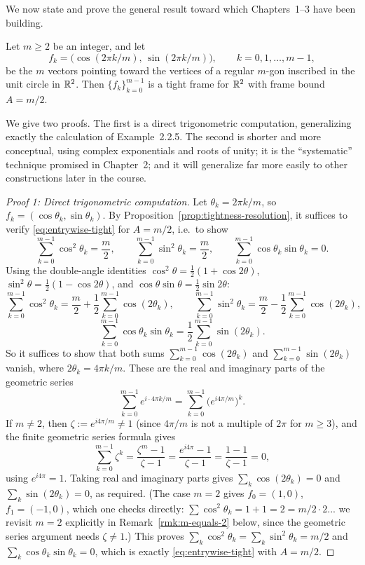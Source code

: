 We now state and prove the general result toward which Chapters~1--3
have been building.

\begin{theorem}
\label{thm:regular-polygon-tight}
Let $m \ge 2$ be an integer, and let
\[
  f_k = \bigl(\cos(2\pi k/m),\, \sin(2\pi k/m)\bigr), \qquad k = 0, 1, \ldots, m-1,
\]
be the $m$ vectors pointing toward the vertices of a regular $m$-gon
inscribed in the unit circle in $\mathbb{R}^2$. Then $\{f_k\}_{k=0}^{m-1}$ is a
tight frame for $\mathbb{R}^2$ with frame bound $A = m/2$.
\end{theorem}

We give two proofs. The first is a direct trigonometric computation,
generalizing exactly the calculation of Example~2.2.5. The second is
shorter and more conceptual, using complex exponentials and roots of
unity; it is the ``systematic'' technique promised in Chapter~2; and it
will generalize far more easily to other constructions later in the
course.

\begin{proof}[Proof 1: Direct trigonometric computation]
Let $\theta_k = 2\pi k/m$, so $f_k = (\cos\theta_k, \sin\theta_k)$. By
Proposition~\ref{prop:tightness-resolution}, it suffices to verify
\eqref{eq:entrywise-tight} for $A = m/2$, i.e.\ to show
\[
  \sum_{k=0}^{m-1}\cos^2\theta_k = \frac{m}{2}, \qquad
  \sum_{k=0}^{m-1}\sin^2\theta_k = \frac{m}{2}, \qquad
  \sum_{k=0}^{m-1}\cos\theta_k\sin\theta_k = 0.
\]
Using the double-angle identities $\cos^2\theta = \tfrac12(1+\cos2\theta)$,
$\sin^2\theta = \tfrac12(1-\cos2\theta)$, and
$\cos\theta\sin\theta = \tfrac12\sin2\theta$:
\[
  \sum_{k=0}^{m-1}\cos^2\theta_k = \frac{m}{2} + \frac12\sum_{k=0}^{m-1}\cos(2\theta_k),
  \qquad
  \sum_{k=0}^{m-1}\sin^2\theta_k = \frac{m}{2} - \frac12\sum_{k=0}^{m-1}\cos(2\theta_k),
\]
\[
  \sum_{k=0}^{m-1}\cos\theta_k\sin\theta_k = \frac12\sum_{k=0}^{m-1}\sin(2\theta_k).
\]
So it suffices to show that both sums $\sum_{k=0}^{m-1}\cos(2\theta_k)$
and $\sum_{k=0}^{m-1}\sin(2\theta_k)$ vanish, where $2\theta_k = 4\pi
k/m$. These are the real and imaginary parts of the geometric series
\[
  \sum_{k=0}^{m-1} e^{i \cdot 4\pi k/m} = \sum_{k=0}^{m-1} \bigl(e^{i4\pi/m}\bigr)^k.
\]
If $m \ne 2$, then $\zeta := e^{i4\pi/m} \ne 1$ (since $4\pi/m$ is not a
multiple of $2\pi$ for $m \ge 3$), and the finite geometric series formula
gives
\[
  \sum_{k=0}^{m-1}\zeta^k = \frac{\zeta^m - 1}{\zeta - 1} = \frac{e^{i4\pi}-1}{\zeta-1} = \frac{1-1}{\zeta-1} = 0,
\]
using $e^{i4\pi}=1$. Taking real and imaginary parts gives
$\sum_k\cos(2\theta_k)=0$ and $\sum_k\sin(2\theta_k)=0$, as required.
(The case $m=2$ gives $f_0=(1,0)$, $f_1=(-1,0)$, which one checks
directly: $\sum\cos^2\theta_k = 1+1=2=m/2\cdot 2$... we revisit $m=2$
explicitly in Remark~\ref{rmk:m-equals-2} below, since the geometric
series argument needs $\zeta\ne1$.) This proves
$\sum_k\cos^2\theta_k=\sum_k\sin^2\theta_k=m/2$ and
$\sum_k\cos\theta_k\sin\theta_k=0$, which is exactly
\eqref{eq:entrywise-tight} with $A=m/2$.
\end{proof}

